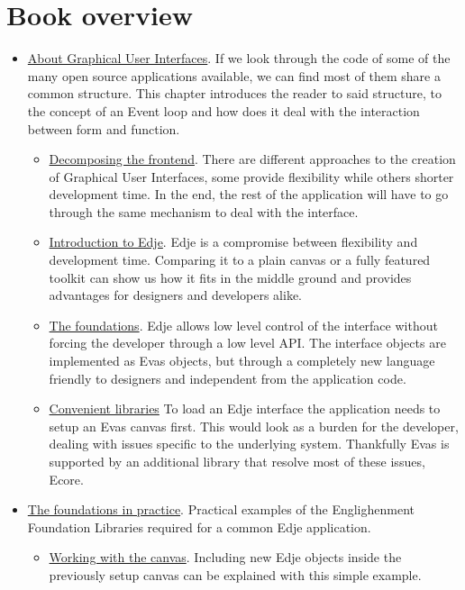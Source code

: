 \documentclass[12pt,a4paper,english]{book}
\begin{document}
\chapter{Book overview}
\label{book-overview}
\begin{itemize}
\item {} 
\href{\#about-graphical-user-interfaces}{About Graphical User Interfaces}.
If we look through the code of some of the many open source applications
available, we can find most of them share a common structure. This chapter
introduces the reader to said structure, to the concept of an Event loop and
how does it deal with the interaction between form and function.
\begin{itemize}
\item {} 
\href{\#decomposing-the-frontend}{Decomposing the frontend}.
There are different approaches to the creation of Graphical User Interfaces,
some provide flexibility while others shorter development time. In the end, the
rest of the application will have to go through the same mechanism to deal
with the interface.

\item {} 
\href{\#introduction-to-edje}{Introduction to Edje}.
Edje is a compromise between flexibility and development time. Comparing it to
a plain canvas or a fully featured toolkit can show us how it fits in the
middle ground and provides advantages for designers and developers alike.

\item {} 
\href{\#the-foundations}{The foundations}.
Edje allows low level control of the interface without forcing the developer
through a low level API. The interface objects are implemented as Evas objects,
but through a completely new language friendly to designers and independent
from the application code.

\item {} 
\href{\#convenient-libraries}{Convenient libraries}
To load an Edje interface the application needs to setup an Evas canvas first.
This would look as a burden for the developer, dealing with issues specific to
the underlying system. Thankfully Evas is supported by an additional library
that resolve most of these issues, Ecore.

\end{itemize}

\item {} 
\href{\#the-foundations-in-practice}{The foundations in practice}.
Practical examples of the Englighenment Foundation Libraries required for a
common Edje application.
\begin{itemize}
\item {} 
\href{\#working-with-the-canvas}{Working with the canvas}.
Including new Edje objects inside the previously setup canvas can be explained
with this simple example.


\end{itemize}
\end{itemize}
\end{document}
